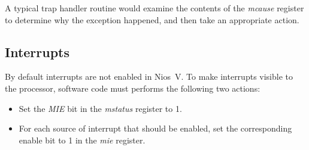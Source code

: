 \documentclass[11pt, twoside, pdftex]{article}
\begin{document}
A typical trap handler routine would examine the contents of the {\it mcause} register to
determine why the exception happened, and then take an appropriate action.

\subsection{Interrupts}
\label{sec:interrupts}

By default interrupts are not enabled in Nios~V. To make interrupts visible to the
processor, software code must performs the following two actions:
\vspace{-\baselineskip}
\begin{itemize}
\item Set the {\it MIE} bit in the {\it mstatus} register to 1. 
\item For each source of interrupt that should be enabled, set the corresponding enable bit 
to 1 in the {\it mie} register.
\end{itemize}
\end{document}
